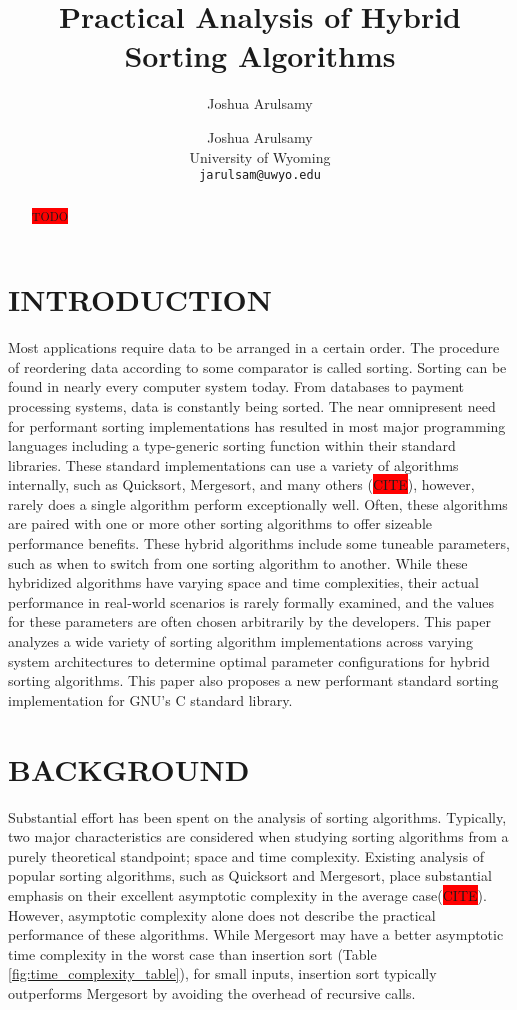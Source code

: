 \documentclass[letter, 12pt, conference]{ieeeconf}
\title{\LARGE \bf Practical Analysis of Hybrid Sorting Algorithms}
\author{Joshua Arulsamy}
\author{\parbox{3 in}{
\centering
Joshua Arulsamy\\
University of Wyoming\\
{\tt\small jarulsam@uwyo.edu}}}
\newcommand{\todo}{\colorbox{red}{TODO}}
\newcommand{\todocite}{\colorbox{red}{CITE}}
\begin{document}
\maketitle
\thispagestyle{plain}
\pagestyle{plain}
\nocite{*}

\begin{abstract}

	\todo

\end{abstract}

\section{INTRODUCTION}

Most applications require data to be arranged in a certain order. The procedure
of reordering data according to some comparator is called sorting. Sorting can
be found in nearly every computer system today. From databases to payment
processing systems, data is constantly being sorted. The near omnipresent need
for performant sorting implementations has resulted in most major programming
languages including a type-generic sorting function within their standard
libraries. These standard implementations can use a variety of algorithms
internally, such as Quicksort, Mergesort, and many others (\todocite), however,
rarely does a single algorithm perform exceptionally well. Often, these
algorithms are paired with one or more other sorting algorithms to offer
sizeable performance benefits. These hybrid algorithms include some tuneable
parameters, such as when to switch from one sorting algorithm to another. While
these hybridized algorithms have varying space and time complexities, their
actual performance in real-world scenarios is rarely formally examined, and the
values for these parameters are often chosen arbitrarily by the developers. This
paper analyzes a wide variety of sorting algorithm implementations across
varying system architectures to determine optimal parameter configurations for
hybrid sorting algorithms. This paper also proposes a new performant standard
sorting implementation for GNU's C standard library.

\section{BACKGROUND}

Substantial effort has been spent on the analysis of sorting algorithms.
Typically, two major characteristics are considered when studying sorting
algorithms from a purely theoretical standpoint; space and time complexity.
Existing analysis of popular sorting algorithms, such as Quicksort and
Mergesort, place substantial emphasis on their excellent asymptotic complexity
in the average case(\todocite). However, asymptotic complexity alone does not
describe the practical performance of these algorithms. While Mergesort may have
a better asymptotic time complexity in the worst case than insertion sort (Table
\ref{fig:time_complexity_table}), for small inputs, insertion sort typically
outperforms Mergesort by avoiding the overhead of recursive calls.
\end{document}
